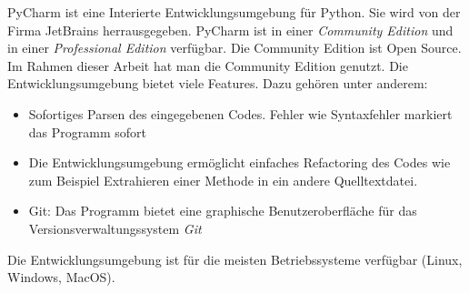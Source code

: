 PyCharm ist eine Interierte Entwicklungsumgebung für Python. Sie wird von der Firma JetBrains herrausgegeben. PyCharm ist in einer \textit{Community Edition} und in einer \textit{Professional Edition} verfügbar. Die Community Edition ist Open Source. Im Rahmen dieser Arbeit hat man die Community Edition genutzt. Die Entwicklungsumgebung bietet viele Features. Dazu gehören unter anderem:
\begin{itemize}
\item Sofortiges Parsen des eingegebenen Codes. Fehler wie Syntaxfehler markiert das Programm sofort
\item Die Entwicklungsumgebung ermöglicht einfaches Refactoring des Codes wie zum Beispiel Extrahieren einer Methode in ein andere Quelltextdatei.
\item Git: Das Programm bietet eine graphische Benutzeroberfläche für das Versionsverwaltungssystem \textit{Git} 
\end{itemize} 
Die Entwicklungsumgebung ist für die meisten Betriebssysteme verfügbar (Linux, Windows, MacOS).


\cite{dembowski2015raspberry}






          
 
